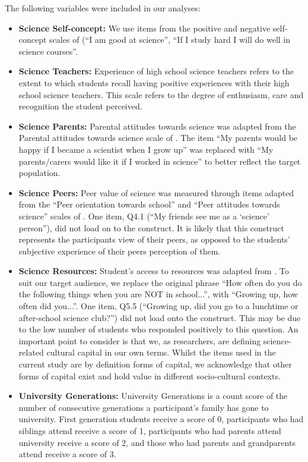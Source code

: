 The following variables were included in our analyses:
\begin{itemize}
    \item \textbf{Science Self-concept:} We use items from the positive and negative self-concept scales of \cite{dewitt2011high} (``I am good at science'', ``If I study hard I will do well in science courses''.   
    \item \textbf{Science Teachers:} Experience of high school science teachers refers to the extent to which students recall having positive experiences with their high school science teachers. This scale refers to the degree of enthusiasm, care and recognition the student perceived. 
    \item \textbf{Science Parents:} Parental attitudes towards science was adapted from the Parental attitudes towards science scale of \cite{dewitt2011high}. The item ``My parents would be happy if I became a scientist when I grow up'' was replaced with ``My parents/carers would like it if I worked in science'' to better reflect the target population.
    \item \textbf{Science Peers:} Peer value of science was measured through items adapted from the ``Peer orientation towards school'' and ``Peer attitudes towards science'' scales of \cite{dewitt2011high}. One item, Q4.1 (``My friends see me as a `science' person''), did not load on to the construct. It is likely that this construct represents the participants view of their peers, as opposed to the students' subjective experience of their peers perception of them.
    \item \textbf{Science Resources:} Student's access to resources was adapted from \cite{dewitt2011high}. To suit our target audience, we replace the original phrase ``How often do you do the following things when you are NOT in school...'', with ``Growing up, how often did you...''. One item, Q5.5 (``Growing up, did you go to a lunchtime or after-school science club?'') did not load onto the construct. This may be due to the low number of students who responded positively to this question. An important point to consider is that we, as researchers, are defining science-related cultural capital in our own terms. Whilst the items used in the current study are by definition forms of capital, we acknowledge that other forms of capital exist and hold value in different socio-cultural contexts.
    \item \textbf{University Generations:} University Generations is a count score of the number of consecutive generations a participant's family has gone to university. First generation students receive a score of 0,  participants who had siblings attend receive a score of 1, participants who had parents attend university receive a score of 2, and those who had parents and grandparents attend receive a score of 3.

\end{itemize}
